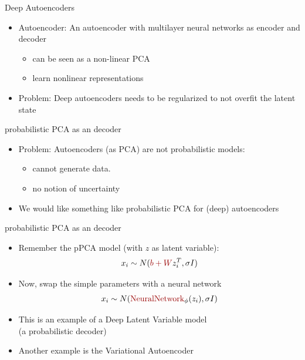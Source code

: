 \documentclass[10pt]{beamer}
\begin{document}
\begin{frame}{Deep Autoencoders}
\begin{itemize}
\item {} Autoencoder: An autoencoder with {\color{uured} multilayer neural networks} as encoder and decoder
\begin{itemize}
\item can be seen as a non-linear PCA
\item learn nonlinear representations
\end{itemize}
\pause
\item Problem: Deep autoencoders needs to be {\color{uured} regularized} to not {\color{uured} overfit} the latent state
\end{itemize}

\end{frame}


\begin{frame}{probabilistic PCA as an decoder}

\begin{itemize}
\item Problem: Autoencoders (as PCA) are not probabilistic models:
\begin{itemize}
\item cannot generate data.
\item no notion of uncertainty
\end{itemize}
\pause
\item We would like something like probabilistic PCA for (deep) autoencoders
\end{itemize}

\end{frame}

\begin{frame}{probabilistic PCA as an decoder}

\begin{itemize}
\item Remember the pPCA model (with $z$ as latent variable):
\[
x_i \sim N({\color{uured}b +  W} z_i^T, \sigma I)
\]
\pause
\item Now, swap the simple parameters with a neural network
\[
x_i \sim N({\color{uured}\text{NeuralNetwork}}_\phi (z_i), \sigma I)
\]
\pause
\item This is an example of a {\color{uured} Deep Latent Variable model}\\(a probabilistic decoder)
\pause
\item Another example is the {\color{uured} Variational Autoencoder}
\end{itemize}

\end{frame}
\end{document}
